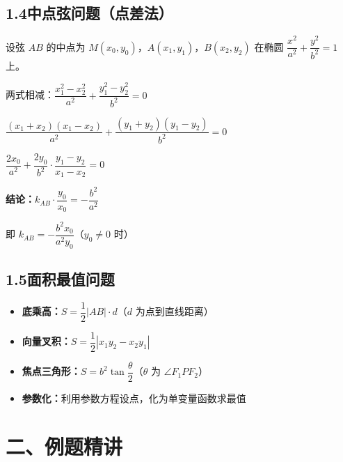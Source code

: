 \documentclass[12pt, a4paper]{ctexart}
\begin{document}
\subsection*{1.4\quad 中点弦问题（点差法）}

\begin{knowledgebox}[点差法]
设弦 $AB$ 的中点为 $M(x_0,y_0)$，$A(x_1,y_1)$，$B(x_2,y_2)$ 在椭圆 $\dfrac{x^2}{a^2}+\dfrac{y^2}{b^2}=1$ 上。

两式相减：$\dfrac{x_1^2-x_2^2}{a^2}+\dfrac{y_1^2-y_2^2}{b^2}=0$

$\dfrac{(x_1+x_2)(x_1-x_2)}{a^2}+\dfrac{(y_1+y_2)(y_1-y_2)}{b^2}=0$

$\dfrac{2x_0}{a^2}+\dfrac{2y_0}{b^2}\cdot\dfrac{y_1-y_2}{x_1-x_2}=0$

\textbf{结论：}$k_{AB}\cdot\dfrac{y_0}{x_0}=-\dfrac{b^2}{a^2}$

即 $k_{AB}=-\dfrac{b^2 x_0}{a^2 y_0}$（$y_0\neq 0$ 时）
\end{knowledgebox}

\subsection*{1.5\quad 面积最值问题}

\begin{knowledgebox}[三角形面积的常见求法]
\begin{itemize}[leftmargin=2em]
  \item \textbf{底乘高：}$S=\dfrac{1}{2}|AB|\cdot d$（$d$ 为点到直线距离）
  \item \textbf{向量叉积：}$S=\dfrac{1}{2}|x_1 y_2-x_2 y_1|$
  \item \textbf{焦点三角形：}$S=b^2\tan\dfrac{\theta}{2}$（$\theta$ 为 $\angle F_1PF_2$）
  \item \textbf{参数化：}利用参数方程设点，化为单变量函数求最值
\end{itemize}
\end{knowledgebox}

\section*{\textcolor{examorange}{二、例题精讲}}
\end{document}
